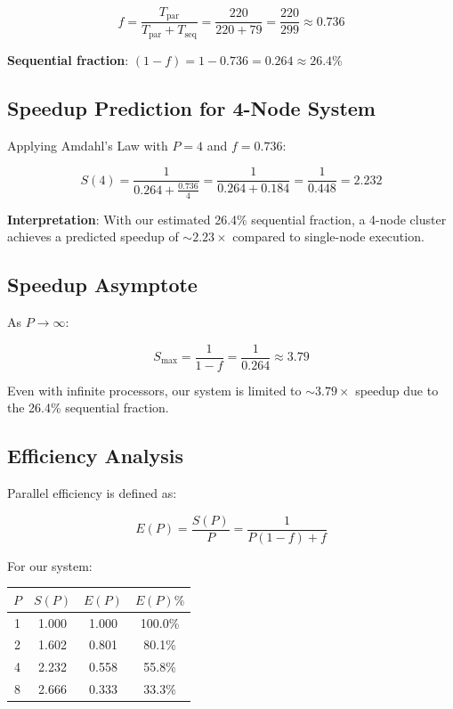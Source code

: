 \documentclass[11pt,a4paper]{article}
\begin{document}
\[
f = \frac{T_{\text{par}}}{T_{\text{par}} + T_{\text{seq}}} = \frac{220}{220 + 79} = \frac{220}{299} \approx 0.736
\]

\textbf{Sequential fraction}: $(1 - f) = 1 - 0.736 = 0.264 \approx 26.4\%$

\subsection{Speedup Prediction for 4-Node System}

Applying Amdahl's Law with $P = 4$ and $f = 0.736$:

\[
S(4) = \frac{1}{0.264 + \frac{0.736}{4}} = \frac{1}{0.264 + 0.184} = \frac{1}{0.448} = \boxed{2.232}
\]

\textbf{Interpretation}: With our estimated 26.4\% sequential fraction, a 4-node cluster achieves a predicted speedup of $\sim 2.23\times$ compared to single-node execution.

\subsection{Speedup Asymptote}

As $P \to \infty$:

\[
S_{\max} = \frac{1}{1-f} = \frac{1}{0.264} \approx \boxed{3.79}
\]

Even with infinite processors, our system is limited to $\sim 3.79\times$ speedup due to the 26.4\% sequential fraction.

\subsection{Efficiency Analysis}

Parallel efficiency is defined as:

\[
E(P) = \frac{S(P)}{P} = \frac{1}{P(1-f) + f}
\]

For our system:

\begin{table}[h]
    \centering
    \begin{tabular}{cccc}
        \hline
        $P$ & $S(P)$ & $E(P)$ & $E(P) \%$ \\
        \hline
        1 & 1.000 & 1.000 & 100.0\% \\
        2 & 1.602 & 0.801 & 80.1\% \\
        4 & 2.232 & 0.558 & 55.8\% \\
        8 & 2.666 & 0.333 & 33.3\% \\
        \hline
    \end{tabular}
\end{table}
\end{document}
